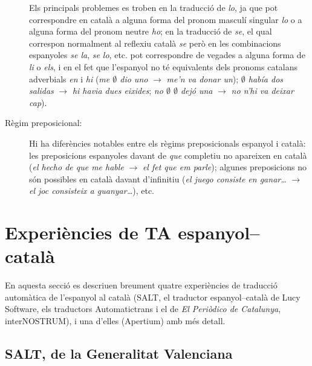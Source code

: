 \begin{description}
Els principals problemes es troben en la traducció de \emph{lo}, ja que
pot correspondre 
en català a alguna forma del pronom masculí singular {\em
  lo} o a alguna forma del
pronom neutre \emph{ho}; en la traducció de 
\emph{se}, el qual correspon normalment al reflexiu 
català \emph{se} però
en les combinacions espanyoles \emph{se la}, \emph{se lo}, etc. pot
correspondre de vegades a alguna forma de \emph{li} o \emph{els}, i en
el fet que l'espanyol no té equivalents dels pronoms catalans
adverbials \emph{en} i \emph{hi}  (\emph{me $\emptyset$ dio uno}
$\rightarrow$
\emph{me'n va donar un}); \emph{$\emptyset$ había dos salidas}
$\rightarrow$ \emph{hi havia dues eixides}; \emph{no $\emptyset$
  $\emptyset$ dejó una} $\rightarrow$ \emph{no n'hi va deixar cap}).
\item[Règim preposicional:] Hi ha diferències notables entre
  els règims preposicionals espanyol i català: les
  preposicions espanyoles davant de \emph{que} completiu no apareixen
  en català (\emph{el hecho de que me hable} $\rightarrow$ \emph{el
    fet que em parle}); algunes preposicions no són possibles en català
  davant d'infinitiu (\emph{el juego consiste en ganar\ldots }
  $\rightarrow$ \emph{el joc consisteix a guanyar\ldots}), etc.
\end{description}

\section{Experiències de TA espanyol--català}
\label{se:ETACC}

En aquesta secció es descriuen breument quatre experiències de
traducció automàtica de l'espanyol al català (SALT, el traductor
espanyol--català de Lucy Software, els traductors Automatictrans i el
de \textit{El Periòdico de Catalunya}, interNOSTRUM), i una d'elles
(Apertium) amb més detall.

\subsection{SALT, de la Generalitat Valenciana}


